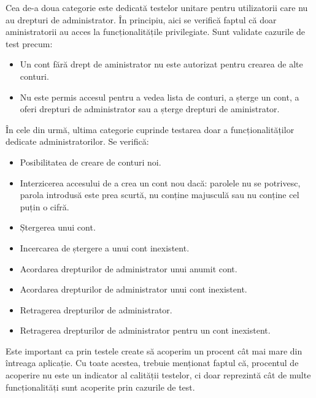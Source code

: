 \vspace{2em}

	Cea de-a doua categorie este dedicată testelor unitare pentru utilizatorii care nu au drepturi de administrator. În principiu, aici se verifică faptul că doar aministratorii au acces la funcționalitățile privilegiate. Sunt validate cazurile de test precum:
 
	\begin{itemize}
			\setlength{\itemindent}{2em}
			\itemsep0em
			\item Un cont fără drept de aministrator nu este autorizat pentru crearea de alte conturi.
			\item Nu este permis accesul pentru a vedea lista de conturi, a șterge un cont, a oferi drepturi de administrator sau a șterge drepturi de aministrator.
	\end{itemize} 

\vspace{2em}

	În cele din urmă, ultima categorie cuprinde testarea doar a funcționalităților dedicate administratorilor. Se verifică:

	\begin{itemize}
			\setlength{\itemindent}{2em}
			\itemsep0em
			\item Posibilitatea de creare de conturi noi.
			\item Interzicerea accesului de a crea un cont nou dacă: parolele nu se potrivesc, parola introdusă este prea scurtă, nu conține majusculă sau nu conține cel puțin o cifră.
			\item Ștergerea unui cont.
			\item Incercarea de ștergere a unui cont inexistent.
			\item Acordarea drepturilor de administrator unui anumit cont.
			\item Acordarea drepturilor de administrator unui cont inexistent.
			\item Retragerea drepturilor de administrator.
			\item Retragerea drepturilor de administrator pentru un cont inexistent.
	\end{itemize} 

	Este important ca prin testele create să acoperim un procent cât mai mare din întreaga aplicație. Cu toate acestea, trebuie menționat faptul că, procentul de acoperire nu este un indicator al calității testelor, ci doar reprezintă cât de multe funcționalități sunt acoperite prin cazurile de test.

